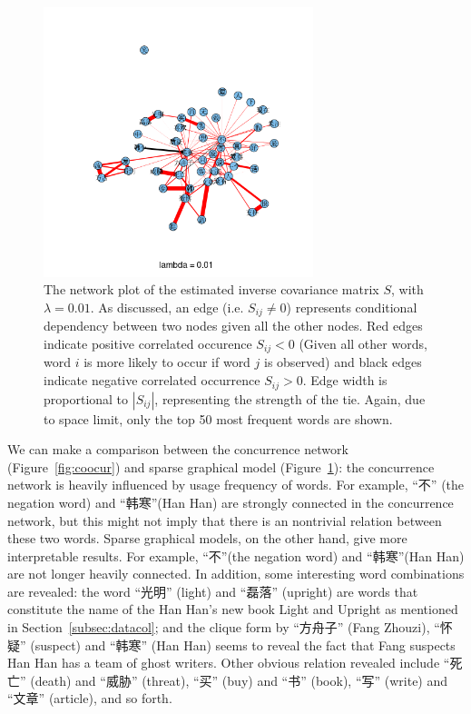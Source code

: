 \documentclass[11pt]{article}
\newcommand{\1}[1]{{\mathbf 1}\left\{#1\right\}}        %
\begin{document}
\begin{center}
\begin{figure}[tb]
   \centering
   \includegraphics[width=0.7\textwidth]{../gLassoResults/glasso1.png} 
      \caption{The network plot of the estimated inverse covariance matrix $S$, with $\lambda = 0.01$. As discussed, an edge (i.e. $S_{ij}\neq 0$) represents conditional dependency between two nodes given all the other nodes. Red edges indicate positive correlated occurence $S_{ij}<0$ (Given all other words, word $i$ is more likely to occur if word $j$ is observed) and black edges indicate negative correlated occurrence $S_{ij}>0$. Edge width is proportional to $|S_{ij}|$, representing the strength of the tie. Again, due to space limit, only the top 50 most frequent words are shown.}
   \label{fig:glasso1}
\end{figure}
\end{center}

We can make a comparison between the concurrence network (Figure~\ref{fig:coocur}) and sparse graphical model (Figure~\ref{fig:glasso1}): the concurrence network is heavily influenced by usage frequency of words. For example, ``不'' (the negation word) and ``韩寒''(Han Han) are strongly connected in the concurrence network, but this might not imply that there is an nontrivial relation between these two words. Sparse graphical models, on the other hand, give more interpretable results. For example,  ``不''(the negation word) and ``韩寒''(Han Han) are not longer heavily connected. In addition, some interesting word combinations are revealed: the word ``光明'' (light) and ``磊落'' (upright) are words that constitute the name of the Han Han's new book {Light and Upright} as mentioned in Section~\ref{subsec:datacol}; and the clique form by ``方舟子'' (Fang Zhouzi), ``怀疑'' (suspect) and  ``韩寒'' (Han Han) seems to reveal the fact that Fang suspects Han Han has a team of ghost writers. Other obvious relation revealed include ``死亡'' (death) and ``威胁'' (threat), ``买'' (buy) and ``书'' (book), ``写'' (write) and ``文章'' (article),  and so forth.
\end{document}
